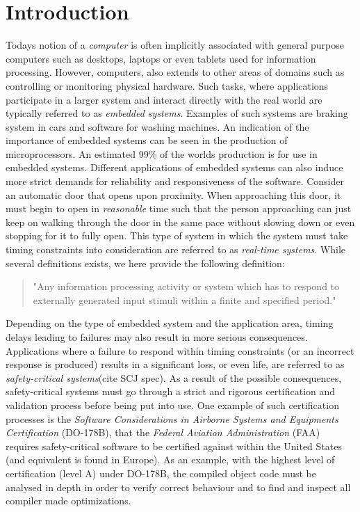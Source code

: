 \chapter{Introduction}
\label{chapter:introduction}
Todays notion of a \textit{computer} is often implicitly associated with general purpose computers such as desktops, laptops or even tablets used for information processing. However, computers, also extends to other areas of domains such as controlling or monitoring physical hardware. Such tasks, where applications participate in a larger system and interact directly with the real world are typically referred to as \textit{embedded systems}. Examples of such systems are braking system in cars and software for washing machines. An indication of the importance of embedded systems can be seen in the production of microprocessors. An estimated 99\% of the worlds production is for use in embedded systems\cite{alan2001real}. Different applications of embedded systems can also induce more strict demands for reliability and responsiveness of the software. Consider an automatic door that opens upon proximity. When approaching this door, it must begin to open in \textit{reasonable} time such that the person approaching can just keep on walking through the door in the same pace without slowing down or even stopping for it to fully open. This type of system in which the system must take timing constraints into consideration are referred to as \textit{real-time systems}. While several definitions exists, we here provide the following definition:
\begin{quotation}
"Any information processing activity or system which has to respond to externally generated input stimuli within a finite and specified period." \cite{alan2001real}
\end{quotation}

Depending on the type of embedded system and the application area, timing delays leading to failures may also result in more serious consequences. Applications where a failure to respond within timing constraints (or an incorrect response is produced) results in a significant loss, or even life, are referred to as \textit{safety-critical systems}(cite SCJ spec). As a result of the possible consequences, safety-critical systems must go through a strict and rigorous certification and validation process before being put into use. One example of such certification processes is the \textit{Software Considerations in Airborne Systems and Equipments Certification} (DO-178B)\cite{DO178B}, that the \textit{Federal Aviation Administration} (FAA) requires safety-critical software to be certified against within the United States (and equivalent is found in Europe). As an example, with the highest level of certification (level A) under DO-178B, the compiled object code must be analysed in depth in order to verify correct behaviour and to find and inspect all compiler made optimizations\cite{DO178B-Example}.

